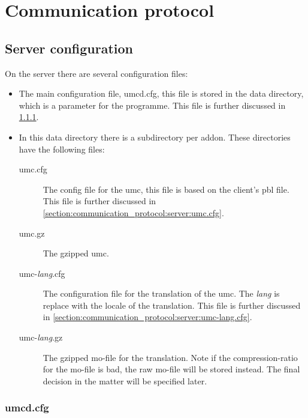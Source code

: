 \chapter{Communication protocol}
\label{chapter:communication_protocol}


\section{Server configuration}
\label{section:communication_protocol:server}

On the server there are several configuration files:
\begin{itemize}
\item
	The main configuration file, umcd.cfg, this file is stored in the
	data directory, which is a parameter for the programme. This file is
	further discussed in \cref{section:communication_protocol:server:umcd.cfg}.

\item
	In this data directory there is a subdirectory per addon. These
	directories have the following files:
	\begin{description}
	\item[umc.cfg]
		The config file for the umc, this file is based on the client's
		pbl file. This file is further discussed in
		\cref{section:communication_protocol:server:umc.cfg}.

	\item[umc.gz]
		The gzipped umc.

	\item[umc-\emph{lang}.cfg]
		The configuration file for the translation of the umc. The
		\emph{lang} is replace with the locale of the translation.
		This file is further discussed in
		\cref{section:communication_protocol:server:umc-lang.cfg}.

	\item[umc-\emph{lang}.gz]
		The gzipped mo-file for the translation. Note if the
		compression-ratio for the mo-file is bad, the raw mo-file will be
		stored instead. The final decision in the matter will be specified
		later.

	\end{description}

\end{itemize}


\subsection{umcd.cfg}
\label{section:communication_protocol:server:umcd.cfg}

